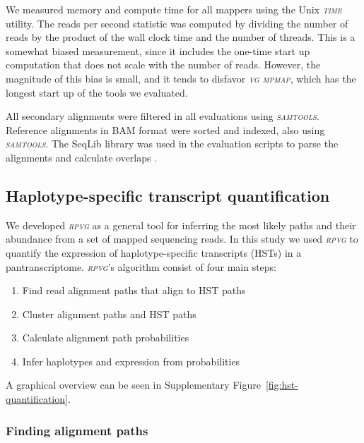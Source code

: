 \documentclass[11pt]{ucthesis}
\newcommand{\tool}[1]{\emph{\textsc{#1}}}
\begin{document}
We measured memory and compute time for all mappers using the Unix \tool{time} utility. The reads per second statistic was computed by dividing the number of reads by the product of the wall clock time and the number of threads. This is a somewhat biased measurement, since it includes the one-time start up computation that does not scale with the number of reads. However, the magnitude of this bias is small, and it tends to disfavor \tool{vg mpmap}, which has the longest start up of the tools we evaluated.

All secondary alignments were filtered in all evaluations using \tool{samtools}. Reference alignments in BAM format were sorted and indexed, also using \tool{samtools}. The SeqLib library was used in the evaluation scripts to parse the alignments and calculate overlaps \cite{wala2016seqlib}.

\subsection{Haplotype-specific transcript quantification}

We developed \tool{rpvg} as a general tool for inferring the most likely paths and their abundance from a set of mapped sequencing reads. In this study we used \tool{rpvg} to quantify the expression of haplotype-specific transcripts (HSTs) in a pantranscriptome. \tool{rpvg}'s algorithm consist of four main steps:

\begin{enumerate}
    \item Find read alignment paths that align to HST paths
    \item Cluster alignment paths and HST paths
    \item Calculate alignment path probabilities 
    \item Infer haplotypes and expression from probabilities
\end{enumerate}

\noindent A graphical overview can be seen in Supplementary Figure~\ref{fig:hst-quantification}. 

\subsubsection{Finding alignment paths}
\end{document}
